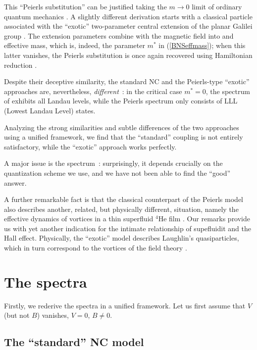 \documentclass[a4paper,11pt]{article}
\let\ssection=\section
\renewcommand{\section}{\setcounter{equation}{0}\ssection}
\begin{document}
This ``Peierls substitution'' can be justified taking the
$m\to0$ limit of ordinary quantum mechanics \cite{DJT, DuJa}.
A slightly different derivation
  \cite{DH}  starts with  a classical particle
  associated with the ``exotic'' two-parameter  central
extension of the planar Galilei group \cite{exotic}.
The extension parameters combine with the magnetic field
into and effective mass, which is, indeed,
  the parameter $m^*$  in (\ref{BNSeffmass});
when this latter
vanishes, the Peierls substitution is once again recovered
using Hamiltonian reduction \cite{FaJa}.


Despite their deceptive similarity, the standard
  NC  \cite{NaPo, GAMB, BNS} and the Peierls-type ``exotic''
  \cite{DH} approaches are, nevertheless, {\it different}~:
in the critical case $m^*=0$,
the spectrum of \cite{BNS}
   exhibits all Landau levels, while the Peierls spectrum \cite{DJT,
   DuJa, DH}
  only consists of LLL (Lowest Landau Level) states.


Analyzing the strong similarities and subtle differences of
the two approaches using a unified framework, we find that the
``standard'' coupling is not entirely satisfactory,
while the ``exotic'' approach works perfectly.

A major issue is the spectrum~:
surprisingly, it depends crucially on the quantization scheme
we use, and we have not been able to find the ``good'' answer.


A further remarkable fact is that the classical counterpart of the
Peierls model \cite{DJT, DH} also
describes another, related, but physically different, situation, namely
the effective dynamics of vortices in a thin superfluid
${}^4$He film \cite{HMC, LeMy}. Our remarks provide us with yet
another indication for the intimate
relationship of supefluidit and the Hall effect.
Physically, the ``exotic'' model describes
Laughlin's quasiparticles,  which in turn correspond
to the vortices of the field theory \cite{QHE}.


\section{The spectra}

Firstly, we rederive the spectra in a unified framework.
Let us first assume that $V$ (but not $B$) vanishes,
$V=0$, $B\neq0$.

\subsection{The ``standard'' NC model}
\end{document}
